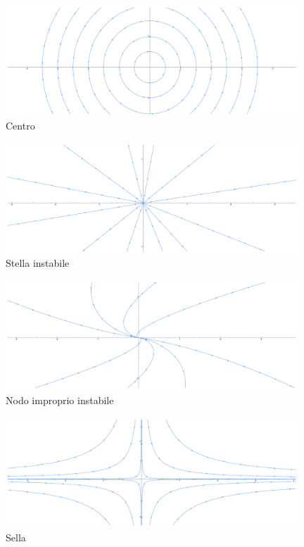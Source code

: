 \begin{figure}[!htb]
    \centering
    \includegraphics[width=11cm]{Immagini/centro.pdf}
    \caption{Centro}
\end{figure}


\begin{figure}[!htb]
    \centering
    \includegraphics[width=11cm]{Immagini/stella_instabile.pdf}
    \caption{Stella instabile}
\end{figure}


\begin{figure}[!htb]
    \centering
    \includegraphics[width=11cm]{Immagini/nodo_improprio_instabile.pdf}
    \caption{Nodo improprio instabile}
\end{figure}


\begin{figure}[!htb]
    \centering
    \includegraphics[width=11cm]{Immagini/sella.pdf}
    \caption{Sella}
\end{figure}


